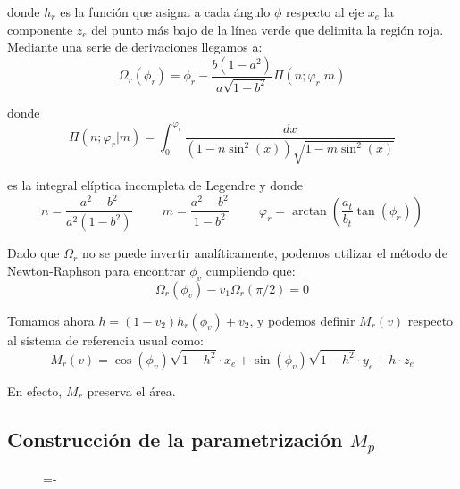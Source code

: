 donde $h_r$ es la función que asigna a cada ángulo $\phi$ respecto al eje $x_e$ la componente $z_e$ del punto más bajo de la línea verde que delimita la región roja. Mediante una serie de derivaciones llegamos a:
$$\Omega_r(\phi_r) = \phi_r -\frac{b(1-a^2)}{a\sqrt{1-b^2}}\Pi(n;\varphi_r|m) $$

donde
$$\Pi(n;\varphi_r|m) = \int_{0}^{\varphi_r}\frac{dx}{(1-n\sin^2(x))\sqrt{1-m\sin^2(x)}}$$

es la integral elíptica incompleta de Legendre y donde
$$n = \frac{a^2-b^2}{a^2(1-b^2)}\hspace{1cm} m=\frac{a^2-b^2}{1-b^2} \hspace{1cm} \varphi_r=\arctan(\frac{a_t}{b_t}\tan(\phi_r))$$

Dado que $\Omega_r$ no se puede invertir analíticamente, podemos utilizar el método de Newton-Raphson para encontrar $\phi_v$ cumpliendo que:
$$\Omega_r(\phi_v)-v_1\Omega_r(\pi/2) = 0 $$

Tomamos ahora $h = (1-v_2)h_r(\phi_v) + v_2$, y podemos definir $M_r(v)$ respecto al sistema de referencia usual como:
$$M_r(v) = \cos(\phi_v)\sqrt{1-h^2}\cdot x_e +\sin(\phi_v)\sqrt{1-h^2}\cdot y_e +h\cdot z_e$$

En efecto, $M_r$ preserva el área.

\subsection{Construcción de la parametrización $M_p$}

\begin{figure}[h]
  \lineskip=-\fboxrule
\end{figure}

